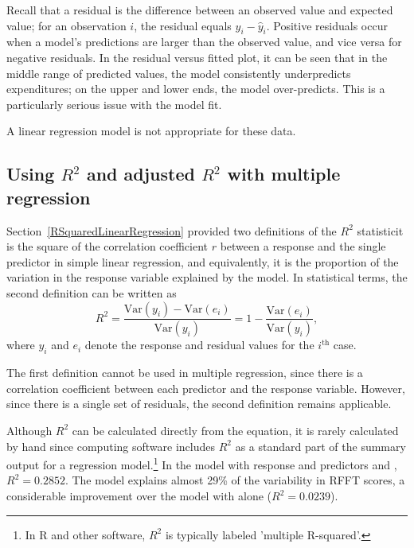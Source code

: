 \begin{example}
Recall that a residual is the difference between an observed value and expected value; for an observation $i$, the residual equals $y_i - \hat{y}_i$. Positive residuals occur when a model's predictions are larger than the observed value, and vice versa for negative residuals. In the residual versus fitted plot, it can be seen that in the middle range of predicted values, the model consistently underpredicts expenditures; on the upper and lower ends, the model over-predicts. This is a particularly serious issue with the model fit. 

A linear regression model is not appropriate for these data.	
	
\end{example}


\subsection{Using $R^2$ and adjusted $R^2$ with multiple regression}

Section~\ref{RSquaredLinearRegression} provided two definitions of the $R^2$ statistic\textemdash it is the square of the correlation coefficient $r$ between a response and the single predictor in simple linear regression, and equivalently, it is the proportion of the variation in the response variable explained by the model.  In statistical terms, the second definition can be written as 
\[
   R^2 = \frac{\text{Var}(y_i) - \text{Var}(e_i)}
   {\text{Var}(y_i)} = 1 - \frac{\text{Var}(e_i)}{\text{Var}(y_i)},
   \label{RSquareDefinition}\]
where $y_i$ and $e_i$ denote the response and residual values for the
$i^{\text{th}}$ case.

The first definition cannot be used in multiple regression, since there is a correlation coefficient between each predictor and the response variable. However, since there is a single set of residuals, the second definition remains applicable. 

Although $R^2$ can be calculated directly from the equation, it is rarely calculated by hand since computing software includes $R^2$ as a standard part of the summary output for a regression model.\footnote{In \textsf{R} and other software, $R^2$ is typically labeled 'multiple R-squared'.} In the model with response  and predictors  and , $R^2 = 0.2852$.  The model explains almost 29\% of the variability in RFFT scores, a considerable improvement over the model with  alone ($R^2 = 0.0239$).


